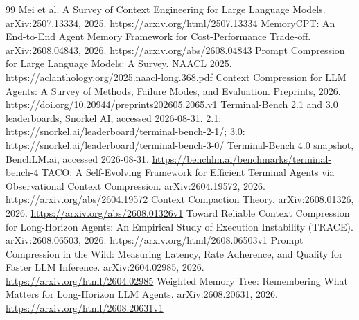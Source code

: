 \documentclass[11pt]{article}
\begin{document}
\begin{thebibliography}{99}
 Mei et al. A Survey of Context Engineering for Large Language Models. arXiv:2507.13334, 2025. \url{https://arxiv.org/html/2507.13334}
 MemoryCPT: An End-to-End Agent Memory Framework for Cost-Performance Trade-off. arXiv:2608.04843, 2026. \url{https://arxiv.org/abs/2608.04843}
 Prompt Compression for Large Language Models: A Survey. NAACL 2025. \url{https://aclanthology.org/2025.naacl-long.368.pdf}
 Context Compression for LLM Agents: A Survey of Methods, Failure Modes, and Evaluation. Preprints, 2026. \url{https://doi.org/10.20944/preprints202605.2065.v1}
 Terminal-Bench 2.1 and 3.0 leaderboards, Snorkel AI, accessed 2026-08-31. 2.1: \url{https://snorkel.ai/leaderboard/terminal-bench-2-1/}; 3.0: \url{https://snorkel.ai/leaderboard/terminal-bench-3-0/}
 Terminal-Bench 4.0 snapshot, BenchLM.ai, accessed 2026-08-31. \url{https://benchlm.ai/benchmarks/terminal-bench-4}
 TACO: A Self-Evolving Framework for Efficient Terminal Agents via Observational Context Compression. arXiv:2604.19572, 2026. \url{https://arxiv.org/abs/2604.19572}
 Context Compaction Theory. arXiv:2608.01326, 2026. \url{https://arxiv.org/abs/2608.01326v1}
 Toward Reliable Context Compression for Long-Horizon Agents: An Empirical Study of Execution Instability (TRACE). arXiv:2608.06503, 2026. \url{https://arxiv.org/html/2608.06503v1}
 Prompt Compression in the Wild: Measuring Latency, Rate Adherence, and Quality for Faster LLM Inference. arXiv:2604.02985, 2026. \url{https://arxiv.org/html/2604.02985}
 Weighted Memory Tree: Remembering What Matters for Long-Horizon LLM Agents. arXiv:2608.20631, 2026. \url{https://arxiv.org/html/2608.20631v1}

\end{thebibliography}
\end{document}

